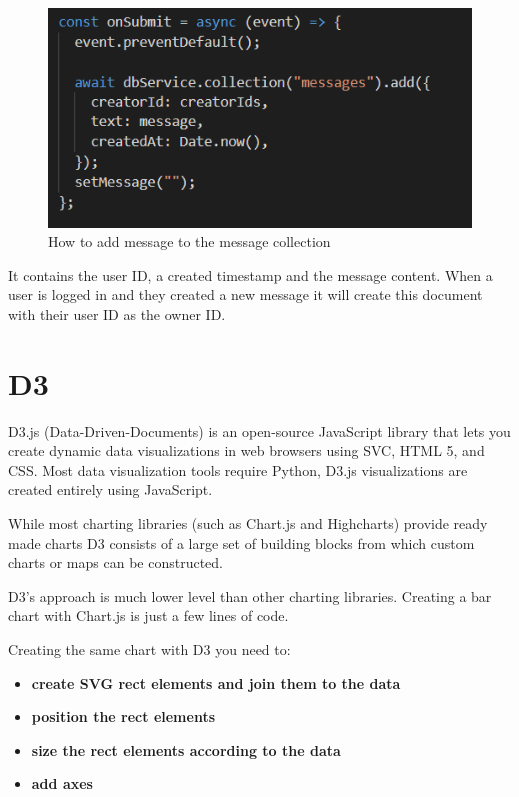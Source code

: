 \begin{figure}[ht]
    \centering
    \includegraphics[scale=0.95]{img/message.PNG}
    \caption{How to add message to the message collection}
    \label{fig:my_labe5}
\end{figure}



It contains the user ID, a created timestamp and the message content.
When a user is logged in and they created a new message it will create this document with their user ID as the owner ID.

\section{D3}

D3.js (Data-Driven-Documents) is an open-source JavaScript library that lets you create dynamic data visualizations in web browsers using SVC, HTML 5, and CSS.
Most data visualization tools require Python, D3.js visualizations are created entirely using JavaScript.

\vspace{5mm}

While most charting libraries (such as Chart.js and Highcharts) provide ready made charts D3 consists of a large set of building blocks from which custom charts or maps can be constructed.

\vspace{2mm}
D3’s approach is much lower level than other charting libraries. Creating a bar chart with Chart.js is just a few lines of code.

Creating the same chart with D3 you need to:

\begin{itemize}

\item \textbf{create SVG rect elements and join them to the data}
\item \textbf{position the rect elements}
\item \textbf{size the rect elements according to the data}
\item \textbf{add axes}

\end{itemize}


